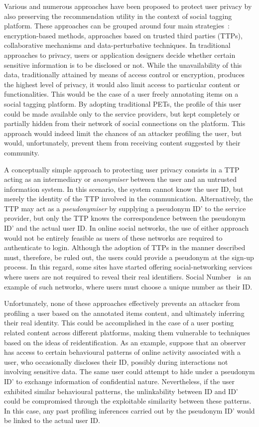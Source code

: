 Various and numerous approaches have been proposed to protect user privacy by also preserving the recommendation utility in the context of social tagging platform. These approaches can be grouped around four main strategies~\cite{Shen07SIGIR}: encryption-based methods, approaches based on trusted third parties (TTPs), collaborative mechanisms and data-perturbative techniques. In traditional approaches to privacy, users or application designers decide whether certain sensitive information is to be disclosed or not. While the unavailability of this data, traditionally attained by means of access control or encryption, produces the highest level of privacy, it would also limit access to particular content or functionalities. This would be the case of a user freely annotating items on a social tagging platform. By adopting traditional PETs, the profile of this user could be made available only to the service providers, but kept completely or partially hidden from their network of social connections on the platform. This approach would indeed limit the chances of an attacker profiling the user, but would, unfortunately, prevent them from receiving content suggested by their community.

A conceptually simple approach to protecting user privacy consists in a TTP acting as an intermediary or \emph{anonymiser} between the user and an untrusted information system. In this scenario, the system cannot know the user ID, but merely the identity of the TTP involved in the communication. Alternatively, the TTP may act as a \emph{pseudonymiser} by supplying a pseudonym ID' to the service provider, but only the TTP knows the correspondence between the pseudonym ID' and the actual user ID. In online social networks, the use of either approach would not be entirely feasible as users of these networks are required to authenticate to login. Although the adoption of TTPs in the manner described must, therefore, be ruled out, the users could provide a pseudonym at the sign-up process. In this regard, some sites have started offering social-networking services where users are not required to reveal their real identifiers. Social Number~\cite{SocialNumber} is an example of such networks, where users must choose a unique number as their ID.

Unfortunately, none of these approaches effectively prevents an attacker from profiling a user based on the annotated items content, and ultimately inferring their real identity. This could be accomplished in the case of a user posting related content across different platforms, making them vulnerable to techniques based on the ideas of reidentification. As an example, suppose that an observer has access to certain behavioural patterns of online activity associated with a user, who occasionally discloses their ID, possibly during interactions not involving sensitive data. The same user could attempt to hide under a pseudonym ID' to exchange information of confidential nature. Nevertheless, if the user exhibited similar behavioural patterns, the unlinkability between ID and ID' could be compromised through the exploitable similarity between these patterns. In this case, any past profiling inferences carried out by the pseudonym ID' would be linked to the actual user ID.

